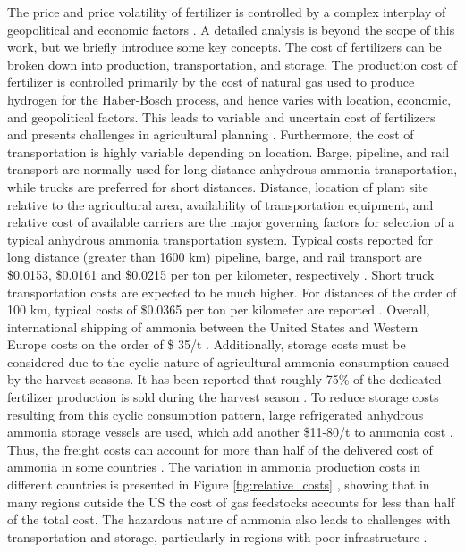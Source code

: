 The price and price volatility of fertilizer is controlled by a complex interplay of geopolitical and economic factors \cite{Huang2007,Etienne2016}. A detailed analysis is beyond the scope of this work, but we briefly introduce some key concepts. The cost of fertilizers can be broken down into production, transportation, and storage. The production cost of fertilizer is controlled primarily by the cost of natural gas used to produce hydrogen for the Haber-Bosch process, and hence varies with location, economic, and geopolitical factors. 
This leads to variable and uncertain cost of fertilizers and presents challenges in agricultural planning \cite{Etienne2016}. Furthermore, the cost of transportation is highly variable depending on location. Barge, pipeline, and rail transport are normally used for long-distance anhydrous ammonia transportation, while trucks are preferred for short distances. Distance, location of plant site relative to the agricultural area, availability of transportation equipment, and relative cost of available carriers are the major governing factors for selection of a typical anhydrous ammonia transportation system. Typical costs reported for long distance (greater than 1600 km) pipeline, barge, and rail transport are \$0.0153, \$0.0161 and \$0.0215 per ton per kilometer, respectively \cite{ammonia_encyclopedia}.  Short truck transportation costs are expected to be much higher. For distances of the order of 100 km, typical costs of \$0.0365 per ton per kilometer are reported \needcite. Overall, international shipping of ammonia between the United States and Western Europe costs on the order of \$ 35/t \needcite. Additionally, storage costs must be considered due to the cyclic nature of agricultural ammonia consumption caused by the harvest seasons. It has been reported that roughly 75\% of the dedicated fertilizer production is sold during the harvest season \needcite. To reduce storage costs resulting from this cyclic consumption pattern, large refrigerated anhydrous ammonia storage vessels are used, which add another \$11-80/t to ammonia cost \cite{IFDC_1998,ammonia_encyclopedia}. Thus, the freight costs can account for more than half of the delivered cost of ammonia in some countries \needcite. The variation in ammonia production costs in different countries is presented in Figure \ref{fig:relative_costs} \cite{maxwell2004synthetic}, showing that in many regions outside the US the cost of gas feedstocks accounts for less than half of the total cost. The hazardous nature of ammonia also leads to challenges with transportation and storage, particularly in regions with poor infrastructure \cite{Etienne2016}. 


